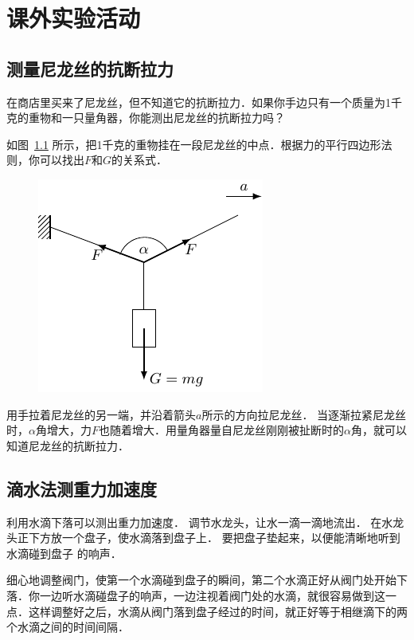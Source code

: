 \chapter{课外实验活动}


\section{测量尼龙丝的抗断拉力}
在商店里买来了尼龙丝，但不知道它的抗断拉力．如果你手边只有一个质量为1千克的重物和一只量角器，你能测出尼龙丝的抗断拉力吗？

如图~\ref{fig_A_10-22} 所示，把1千克的重物挂在一段尼龙丝的中点．根据力的平行四边形法则，你可以找出$F$和$G$的关系式．

\begin{figure}[htbp]
	\centering
	\includegraphics{fig/A/10-22.pdf}
	\caption{}\label{fig_A_10-22}
\end{figure}


用手拉着尼龙丝的另一端，并沿着箭头$a$所示的方向拉尼龙丝．
当逐渐拉紧尼龙丝时，$\alpha$角增大，力$F$也随着增大．用量角器量自尼龙丝刚刚被扯断时的$\alpha$角，就可以知道尼龙丝的抗断拉力．



\section{滴水法测重力加速度}

利用水滴下落可以测出重力加速度．
调节水龙头，让水一滴一滴地流出．
在水龙头正下方放一个盘子，使水滴落到盘子上．
要把盘子垫起来，以便能清晰地听到水滴碰到盘子
的响声．

细心地调整阀门，使第一个水滴碰到盘子的瞬间，第二个水滴正好从阀门处开始下落．你一边听水滴碰盘子的响声，一边注视着阀门处的水滴，就很容易做到这一点．这样调整好之后，水滴从阀门落到盘子经过的时间，就正好等于相继滴下的两个水滴之间的时间间隔．

